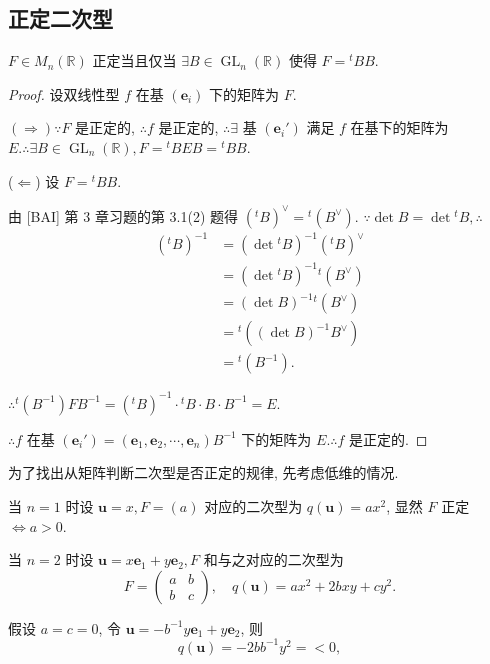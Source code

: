 \documentclass{ctexart}
\begin{document}
\subsection{正定二次型}
\begin{theorem}[书上的定理 6]
    $F\in M_n(\mathbb{R})$ 正定当且仅当 $\exists B\in\operatorname{GL}_n(\mathbb{R})$ 使得 $F={}^tBB$.
\end{theorem}
\begin{proof}
    设双线性型 $f$ 在基 $(\boldsymbol{e}_i)$ 下的矩阵为 $F$.
    
    $(\Rightarrow)\because F$ 是正定的, $\therefore f$ 是正定的, $\therefore\exists$ 基 $(\boldsymbol{e}_i')$ 满足 $f$ 在基下的矩阵为 $E.\therefore\exists B\in\operatorname{GL}_n(\mathbb{R}),F={}^tBEB={}^tBB$.

    ($\Leftarrow$) 设 $F={}^tBB$.

    由 [BAI] 第 3 章习题的第 3.1(2) 题得 $({}^tB)^\vee={}^t(B^\vee)$. $\because\det B=\det{}^tB,\therefore$
    \begin{align*}
        ({}^tB)^{-1} & =(\det{}^tB)^{-1}({}^tB)^\vee \\
        & =(\det{}^tB)^{-1}{}^t(B^\vee) \\
        & =(\det B)^{-1}{}^t(B^\vee) \\
        & ={}^t((\det B)^{-1}B^\vee) \\
        & ={}^t(B^{-1}).
    \end{align*}

    $\therefore{}^t(B^{-1})FB^{-1}=({}^tB)^{-1}\cdot{}^tB\cdot B\cdot B^{-1}=E$.

    $\therefore f$ 在基 $(\boldsymbol{e}_i')=(\boldsymbol{e}_1,\boldsymbol{e}_2,\cdots,\boldsymbol{e}_n)B^{-1}$ 下的矩阵为 $E.\therefore f$ 是正定的.
\end{proof}
为了找出从矩阵判断二次型是否正定的规律, 先考虑低维的情况.

当 $n=1$ 时设 $\boldsymbol{u}=x,F=(a)$ 对应的二次型为 $q(\boldsymbol{u})=ax^2$, 显然 $F$ 正定 $\Leftrightarrow a>0$.

当 $n=2$ 时设 $\boldsymbol{u}=x\boldsymbol{e}_1+y\boldsymbol{e}_2,F$ 和与之对应的二次型为
\[F=\begin{pmatrix}
    a & b \\
    b & c
\end{pmatrix},\quad q(\boldsymbol{u})=ax^2+2bxy+cy^2.\]

假设 $a=c=0$, 令 $\boldsymbol{u}=-b^{-1}y\boldsymbol{e}_1+y\boldsymbol{e}_2$, 则
\[q(\boldsymbol{u})=-2bb^{-1}y^2=<0,\]
\end{document}
